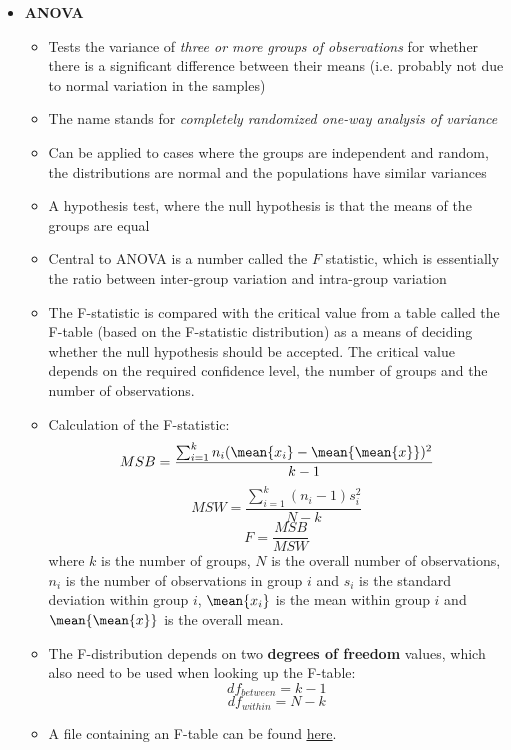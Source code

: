 \begin{itemize}
\begin{itemize}
\begin{itemize}
    \end{itemize}
  \end{itemize}
  \newpage
\item \textbf{ANOVA}
  \begin{itemize}
  \item Tests the variance of \emph{three or more groups of observations} for whether there is a significant difference between their means (i.e. probably not due to normal variation in the samples)
  \item The name stands for \emph{completely randomized one-way analysis of variance}
  \item Can be applied to cases where the groups are independent and random, the distributions are normal and the populations have similar variances
  \item A hypothesis test, where the null hypothesis is that the means of the groups are equal
  \item Central to ANOVA is a number called the $F$ statistic, which is essentially the ratio between inter-group variation and intra-group variation
  \item The F-statistic is compared with the critical value from a table called the F-table (based on the F-statistic distribution) as a means of deciding whether the null hypothesis should be accepted. The critical value depends on the required confidence level, the number of groups and the number of observations.
    \newpage
  \item Calculation of the F-statistic:
    $$ MSB = \dfrac{\sum_{i=1}^k n_i(\mean{x_i} - \mean{\mean{x}})^2}{k-1}$$
    $$ MSW = \dfrac{\sum_{i=1}^k (n_i - 1)s_i^2}{N-k}$$
    $$ F = \dfrac{MSB}{MSW}$$
    where $k$ is the number of groups, $N$ is the overall number of observations, $n_i$ is the number of observations in group $i$ and $s_i$ is the standard deviation within group $i$, $\mean{x_i}$ is the mean within group $i$ and $\mean{\mean{x}}$ is the overall mean.
  \item The F-distribution depends on two \textbf{degrees of freedom} values, which also need to be used when looking up the F-table:
    $$ df_{between} = k - 1$$
    $$ df_{within} = N - k $$

    \item A file containing an F-table can be found \underline{\href{http://www.stat.purdue.edu/~jtroisi/STAT350Spring2015/tables/FTable.pdf}{here}}.
    

\end{itemize}
\end{itemize}
